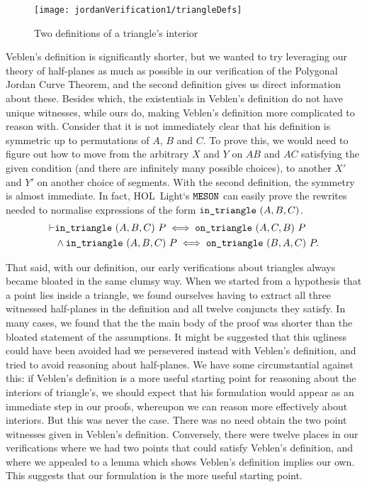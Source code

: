 \begin{figure}
\centering\texttt{[image: jordanVerification1/triangleDefs]}
\caption{Two definitions of a triangle's interior}
\label{fig:triangleDefs}
\end{figure}

Veblen's definition is significantly shorter, but we wanted to try leveraging our theory of half-planes as much as possible in our verification of the Polygonal Jordan Curve Theorem, and the second definition gives us direct information about these. Besides which, the existentials in Veblen's definition do not have unique witnesses, while ours do, making Veblen's definition more complicated to reason with. Consider that it is not immediately clear that his definition is symmetric up to permutations of $A$, $B$ and $C$. To prove this, we would need to figure out how to move from the arbitrary $X$ and $Y$ on $AB$ and $AC$ satisfying the given condition (and there are infinitely many possible choices), to another $X'$ and $Y'$ on another choice of segments. With the second definition, the symmetry is almost immediate. In fact, HOL~Light`s $\texttt{MESON}$ can easily prove the rewrites needed to normalise expressions of the form $\texttt{in\_triangle}\ (A,B,C)$. 
\begin{equation}\label{eq:triSyms}
  \begin{split}
    \vdash&\code{in\_triangle}\ (A,B,C)\ P \iff \code{on\_triangle}\ (A,C,B)\ P\\
&    \wedge \code{in\_triangle}\ (A,B,C)\ P \iff \code{on\_triangle}\ (B,A,C)\ P.
  \end{split}
\end{equation}

That said, with our definition, our early verifications about triangles always became bloated in the same clumsy way. When we started from a hypothesis that a point lies inside a triangle, we found ourselves having to extract all three witnessed half-planes in the definition and all twelve conjuncts they satisfy. In many cases, we found that the the main body of the proof was shorter than the bloated statement of the assumptions. It might be suggested that this ugliness could have been avoided had we persevered instead with Veblen's definition, and tried to avoid reasoning about half-planes. We have some circumstantial against this: if Veblen's definition is a more useful starting point for reasoning about the interiors of triangle's, we should expect that his formulation would appear as an immediate step in our proofs, whereupon we can reason more effectively about interiors. But this was never the case. There was no need obtain the two point witnesses given in Veblen's definition. Conversely, there were twelve places in our verifications where we had two points that could satisfy Veblen's definition, and where we appealed to a lemma which shows Veblen's definition implies our own. This suggests that our formulation is the more useful starting point.

